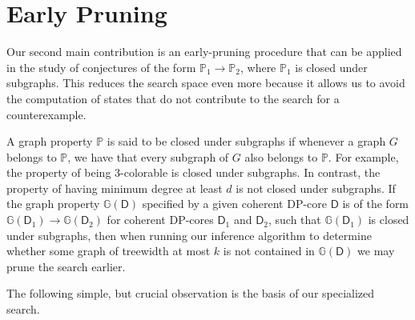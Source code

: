 \documentclass[11pt,a4paper]{article}
\newcommand{\treewidthvalue}{k}
\newcommand{\agraph}{G}
\newcommand{\graphproperty}{\mathbb{P}}
\newcommand{\dpcoregraphproperty}[1]{\mathbb{G}(#1)}
\newcommand{\dpcore}{\mathsf{D}}
\newcommand{\combinator}{\mathcal{C}}
\begin{document}
% 

\section{Early Pruning}
\label{section:EarlyPruning}

Our second main contribution is an early-pruning procedure that can be applied in the study of conjectures of the form $\graphproperty_1\rightarrow \graphproperty_2$, where $\graphproperty_1$ is closed under subgraphs. This reduces the search space even more because it allows us to avoid the computation of states that do not contribute to the search for a counterexample.


A graph property $\graphproperty$ is said to be closed under subgraphs if
whenever a graph $\agraph$ belongs to $\graphproperty$, we have that
every subgraph of $\agraph$ also belongs to $\graphproperty$.
For example, the property of being $3$-colorable is closed under subgraphs.
In contrast, the property of having minimum degree at least $d$ is not closed under subgraphs.
If the graph property $\dpcoregraphproperty{\dpcore}$ specified by a given coherent DP-core $\dpcore$ is of the form $\dpcoregraphproperty{\dpcore_1}\rightarrow \dpcoregraphproperty{\dpcore_2}$ for coherent DP-cores $\dpcore_1$ and $\dpcore_2$, such that $\dpcoregraphproperty{\dpcore_1}$ is closed under subgraphs, then when running our inference algorithm to
determine whether some graph of treewidth at most $\treewidthvalue$ is not contained in $\dpcoregraphproperty{\dpcore}$ we may prune the search earlier.

The following simple, but crucial observation is the basis of our specialized search.
\end{document}
